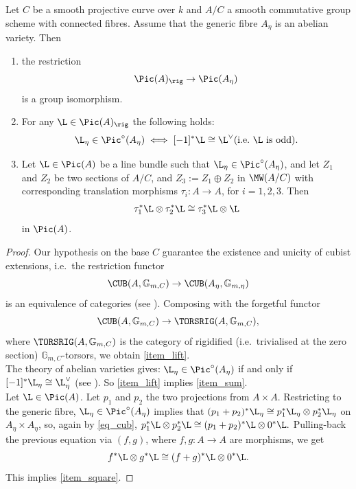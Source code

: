 \documentclass[12pt, english]{amsart}
\begin{document}
\begin{proposition}\label{prop_main}
Let $C$ be a smooth projective curve over $k$ and $A/C$ a smooth commutative group scheme with connected fibres. Assume that the generic fibre $A_\eta$ is an abelian variety. Then
\begin{enumerate}
    \item\label{item_lift} the restriction $$\Pic(A)_{\rig} \to \Pic(A_\eta)$$ is a group isomorphism.
\item\label{item_sum} For any $\L\in \Pic(A)_{\rig}$ the following holds:
$$\L_\eta\in \Pic^\circ(A_\eta) \iff [-1]^*\L \cong \L^\vee \text{(i.e.\ $\L$ is odd)}.$$
\item\label{item_square} Let $\L\in \Pic(A)$ be a line bundle such that $\L_\eta\in \Pic^\circ(A_\eta)$, and let $Z_1$ and $Z_2$ be two sections of $A/C$, and $Z_3:=Z_1\oplus Z_2$ in $\MW(A/C)$ with corresponding translation morphisms $\tau_i\colon A\to A$, for $i=1,2,3$.
Then
$$\tau_1^*\L \otimes \tau_2^*\L \cong \tau_3^*\L \otimes \L$$
in $\Pic(A)$.
\end{enumerate}
\end{proposition}

\begin{proof}
Our hypothesis on the base $C$ guarantee the existence and unicity of cubist extensions, i.e.\ the restriction functor 
\begin{equation}\label{eq_cub}
    \CUB(A,\mathbb{G}_{m,C}) \to \CUB(A_\eta,\mathbb{G}_{m,\eta})
\end{equation}
is an equivalence of categories (see \cite[Ch.~2, Theorem 1.1]{M85}). Composing with the forgetful functor $$\CUB(A,\mathbb{G}_{m,C}) \to \TORSRIG(A,\mathbb{G}_{m,C}),$$ where $\TORSRIG(A,\mathbb{G}_{m,C})$ is the category of rigidified (i.e.\ trivialised at the zero section) $\mathbb{G}_{m,C}$-torsors, we obtain \autoref{item_lift}.
\\The theory of abelian varieties gives: $\L_\eta\in \Pic^\circ(A_\eta)$ if and only if $[-1]^*\L_\eta \cong \L_\eta^\vee$ (see \cite[Ch.~5, Proposition~2.3]{L83}). So \autoref{item_lift} implies \autoref{item_sum}.
\\Let $\L\in \Pic(A)$. Let $p_1$ and $p_2$ the two projections from $A\times A$. Restricting to the generic fibre, $\L_\eta\in \Pic^\circ(A_\eta)$ implies that $(p_1+p_2)^*\L_\eta \cong p_1^*\L_\eta \otimes p_2^*\L_\eta$ on $A_\eta\times A_\eta$, so, again by \autoref{eq_cub}, $p_1^*\L \otimes p_2^*\L \cong (p_1+p_2)^*\L \otimes 0^*\L.$
Pulling-back the previous equation via $(f,g)$, where $f,g\colon A \to A$ are morphisms, we get 
$$f^*\L \otimes g^*\L \cong (f+g)^*\L \otimes 0^*\L.$$
This implies \autoref{item_square}.
\end{proof}
\end{document}
